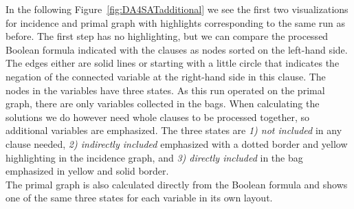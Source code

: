 \documentclass[a4paper, 12pt, bibliography=totoc]{scrartcl}
\begin{document}
\medskip\noindent
In the following Figure~\ref{fig:DA4SATadditional} we see the first two visualizations for incidence and primal graph with highlights corresponding to the same run as before. The first step has no highlighting, but we can compare the processed Boolean formula indicated with the clauses as nodes sorted on the left-hand side. The edges either are solid lines or starting with a little circle that indicates the negation of the connected variable at the right-hand side in this clause. The nodes in the variables have three states. As this run operated on the primal graph, there are only variables collected in the bags. When calculating the solutions we do however need whole clauses to be processed together, so additional variables are emphasized. The three states are \textit{1) not included} in any clause needed, \textit{2) indirectly included} emphasized with a dotted border and yellow highlighting in the incidence graph, and \textit{3) directly included} in the bag emphasized in yellow and solid border. \\
The primal graph is also calculated directly from the Boolean formula and shows one of the same three states for each variable in its own layout.
\end{document}
